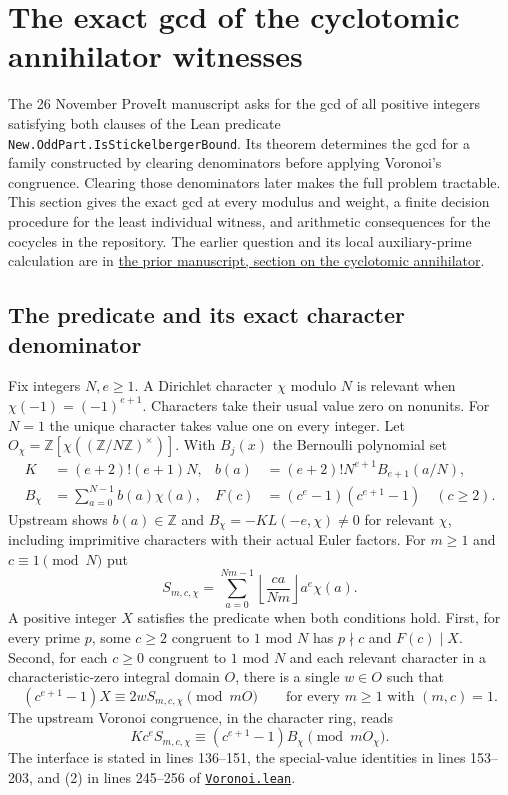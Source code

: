 \section{The exact gcd of the cyclotomic annihilator witnesses}
\label{sec:exact-stickelberger}

The 26 November ProveIt manuscript asks for the gcd of all positive integers
satisfying both clauses of the Lean predicate
\texttt{New.OddPart.IsStickelbergerBound}. Its theorem determines the gcd
for a family constructed by clearing denominators before applying Voronoi's
congruence. Clearing those denominators later makes the full problem tractable.
This section gives the exact gcd at every modulus and weight, a finite
decision procedure for the least individual witness, and arithmetic consequences
for the cocycles in the repository.
The earlier question and its local auxiliary-prime calculation are in
\href{https://github.com/VladimirReshetnikov/ProveIt/blob/a1d43d8a32add57d596273e04648bc96a0a9bc0d/docs/incoming/grh_method_transfers_2026-11-26.zip}{the prior manuscript, section on the cyclotomic annihilator}.

\subsection{The predicate and its exact character denominator}

Fix integers $N,e\ge1$. A Dirichlet character $\chi$ modulo $N$ is relevant
when $\chi(-1)=(-1)^{e+1}$. Characters take their usual value zero on
nonunits. For $N=1$ the unique character takes value one on every integer.
Let $O_\chi=\mathbb Z[\chi((\mathbb Z/N\mathbb Z)^\times)]$.
With $B_j(x)$ the Bernoulli polynomial set
\begin{align*}
 K&=(e+2)!(e+1)N,&
 b(a)&=(e+2)!N^{e+1}B_{e+1}(a/N),\\
 B_\chi&=\sum_{a=0}^{N-1} b(a)\chi(a),&
 F(c)&=(c^e-1)(c^{e+1}-1)\quad(c\ge2).
\end{align*}
Upstream shows $b(a)\in\mathbb Z$ and $B_\chi=-K L(-e,\chi)\ne0$ for
relevant $\chi$, including imprimitive characters with their actual Euler factors.
For $m\ge1$ and $c\equiv1\pmod N$ put
\[
 S_{m,c,\chi}=\sum_{a=0}^{Nm-1}
   \left\lfloor\frac{ca}{Nm}\right\rfloor a^e\chi(a).
\]
A positive integer $X$ satisfies the predicate when both conditions hold.
First, for every prime $p$, some $c\ge2$ congruent to $1$ mod $N$ has
$p\nmid c$ and $F(c)\mid X$. Second, for each $c\ge0$ congruent to $1$
mod $N$ and each relevant character in a characteristic-zero integral domain
$O$, there is a single $w\in O$ such that
\[
  (c^{e+1}-1)X\equiv 2w S_{m,c,\chi}\pmod{mO}
  \qquad\text{for every }m\ge1\text{ with }(m,c)=1.             \tag{1}
\]
The upstream Voronoi congruence, in the character ring, reads
\[
 Kc^e S_{m,c,\chi}\equiv (c^{e+1}-1)B_\chi\pmod{mO_\chi}.    \tag{2}
\]
The interface is stated in lines 136--151, the special-value identities
in lines 153--203, and (2) in lines 245--256 of
\href{https://github.com/lsernau/grh-lean/blob/72fead102f663d5c7a407964a13dc0cf9d977207/grh/src/Lib/Cyclotomic/Voronoi.lean}{\texttt{Voronoi.lean}}.

